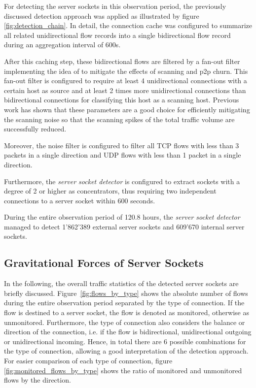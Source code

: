 For detecting the \glspl{server socket} in this observation period, the 
previously discussed detection approach was applied as illustrated by figure 
\ref{fig:detection_chain}. In detail, the connection cache was configured to 
summarize all related unidirectional flow records into a single bidirectional 
flow record during an aggregation interval of 600s. 

After this caching step, these bidirectional flows are filtered by a fan-out 
filter implementing the idea of \citet{Allman:2007} to mitigate the effects of 
scanning and \gls{p2p} churn. This fan-out filter is configured to require at 
least 4 unidirectional connections with a certain host as source and at least 2 
times more unidirectional connections than bidirectional connections for 
classifying this host as a scanning host. 
Previous work\citep{Schatzmann:Mining,Schatzmann:Dissection, Schatzmann:Tracing} 
has shown that these parameters are a good choice for efficiently mitigating the 
scanning noise so that the scanning spikes of the total traffic volume are 
successfully reduced.

Moreover, the noise filter is configured to filter all \gls{TCP} flows with less 
than 3 packets in a single direction and \gls{UDP} flows with less than 1 packet 
in a single direction. 

Furthermore, the \emph{server socket detector} is configured to extract sockets 
with a degree of 2 or higher as concentrators, thus requiring two independent 
connections to a \gls{server socket} within 600 seconds. 

During the entire observation period of 120.8 hours, the \emph{server socket detector} managed to detect 1'862'389 external \glspl{server socket} and 609'670 internal \glspl{server socket}.

\subsection{Gravitational Forces of Server Sockets}
In the following, the overall traffic statistics of the detected 
\glspl{server socket} are briefly discussed. Figure \ref{fig:flows_by_type} 
shows the absolute number of flows during the entire observation period 
separated by the type of connection. If the flow is destined to a 
\gls{server socket}, the flow is denoted as monitored, otherwise as unmonitored. 
Furthermore, the type of connection also considers the balance or direction of 
the connection, i.e. if the flow is bidirectional, unidirectional outgoing or 
unidirectional incoming. Hence, in total there are 6 possible combinations for 
the type of connection, allowing a good interpretation of the detection 
approach. For easier comparison of each type of connection, figure 
\ref{fig:monitored_flows_by_type} shows the ratio of monitored and unmonitored 
flows by the direction.


